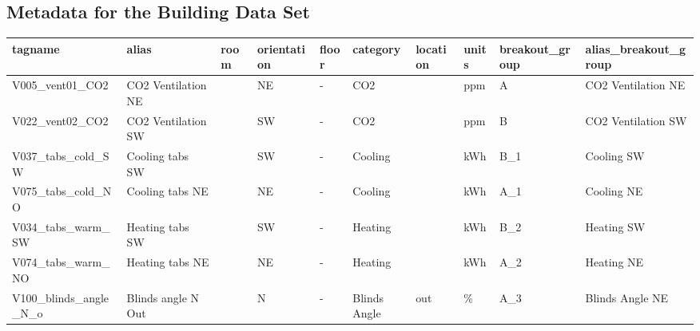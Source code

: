 \begin{landscape}
\leavevmode
\newline


\section{Metadata for the Building Data Set} 
\label{sec:metadata_t}

\begin{table}[htbp]
  \centering
   \scriptsize
    \begin{tabular}{|l|l|r|l|l|l|l|l|l|l|}
    \hline
    \rowcolor[rgb]{ 0,  0,  0} \textcolor[rgb]{ 1,  1,  1}{\textbf{tagname}} & \textcolor[rgb]{ 1,  1,  1}{\textbf{alias}} & \multicolumn{1}{l|}{\textcolor[rgb]{ 1,  1,  1}{\textbf{room}}} & \textcolor[rgb]{ 1,  1,  1}{\textbf{orientation}} & \textcolor[rgb]{ 1,  1,  1}{\textbf{floor}} & \textcolor[rgb]{ 1,  1,  1}{\textbf{category}} & \textcolor[rgb]{ 1,  1,  1}{\textbf{location}} & \textcolor[rgb]{ 1,  1,  1}{\textbf{units}} & \textcolor[rgb]{ 1,  1,  1}{\textbf{breakout\_group}} & \textcolor[rgb]{ 1,  1,  1}{\textbf{alias\_breakout\_group}} \bigstrut\\
    \hline
    \rowcolor[rgb]{ .851,  .851,  .851} V005\_vent01\_CO2 & CO2 Ventilation NE &      & NE   & -    & CO2  &      & ppm  & A    & CO2 Ventilation NE \bigstrut\\
    \hline
    V022\_vent02\_CO2 & CO2 Ventilation SW &      & SW   & -    & CO2  &      & ppm  & B    & CO2 Ventilation SW \bigstrut\\
    \hline
    \rowcolor[rgb]{ .851,  .851,  .851} V037\_tabs\_cold\_SW & Cooling tabs SW &      & SW   & -    & Cooling &      & kWh  & B\_1 & Cooling SW \bigstrut\\
    \hline
    V075\_tabs\_cold\_NO & Cooling tabs NE &      & NE   & -    & Cooling &      & kWh  & A\_1 & Cooling NE \bigstrut\\
    \hline
    \rowcolor[rgb]{ .851,  .851,  .851} V034\_tabs\_warm\_SW & Heating tabs SW &      & SW   & -    & Heating &      & kWh  & B\_2 & Heating SW \bigstrut\\
    \hline
    V074\_tabs\_warm\_NO & Heating tabs NE &      & NE   & -    & Heating &      & kWh  & A\_2 & Heating NE \bigstrut\\
    \hline
    \rowcolor[rgb]{ .851,  .851,  .851} V100\_blinds\_angle\_N\_o & Blinds angle N Out &      & N    & -    & Blinds Angle & out  & \%   & A\_3 & Blinds Angle NE \bigstrut\\

\end{tabular}
\end{table}
\end{landscape}
